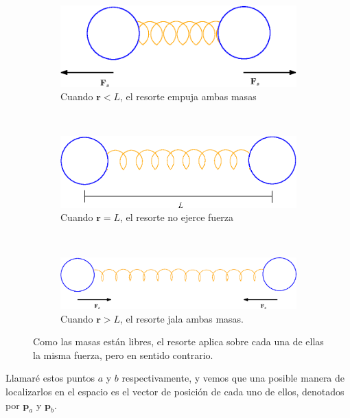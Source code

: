 \begin{figure}[hbt]
\centering
  \begin{subfigure}[b]{0.45\textwidth}
    \includegraphics[width=\textwidth]{img/01/resortesJuntos}
    \caption{Cuando $\textbf{r}<L$, el resorte empuja ambas masas}
    \label{fig:juntos}
  \end{subfigure}
\\
  \begin{subfigure}[b]{0.5\textwidth}
    \includegraphics[width=\textwidth]{img/01/resortesNormal}
    \caption{Cuando $\textbf{r}=L$, el resorte no ejerce fuerza}
    \label{fig:normales}
  \end{subfigure}
\\
  \begin{subfigure}[b]{0.7\textwidth}
    \includegraphics[width=\textwidth]{img/01/resortesSeparados}
    \caption{Cuando $\textbf{r}>L$, el resorte jala ambas masas.}
    \label{fig:estirados}
  \end{subfigure}
 \caption[Masas libres en el espacio unidas por un resorte]{ 
 Como las masas están libres, el resorte aplica sobre cada una de ellas la misma fuerza, pero en sentido contrario.
 } \label{masaSuelta:fig}
\end{figure}

Llamaré estos puntos $a$ y $b$ respectivamente, y vemos que una posible manera de localizarlos en el espacio es el vector de posición de cada uno de ellos, denotados por $\textbf{p}_a$ y $\textbf{p}_b$.

